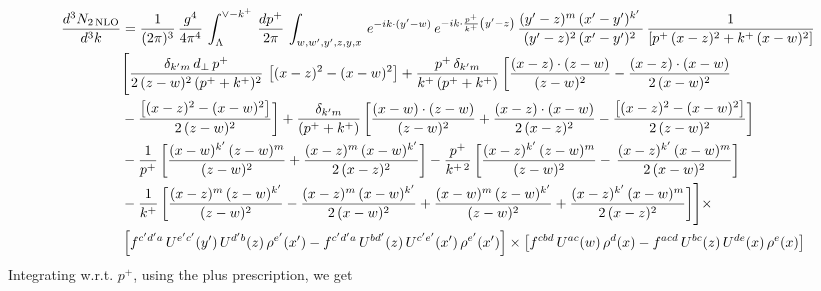 \documentclass[9pt]{article}
\numberwithin{equation}{section}
\begin{document}
\begin{align}
 \frac{d^{3}N_{2\,\rm NLO}}{d^{3}k} & =  \frac{1}{(2\pi)^{3}}\,\frac{g^{4}}{4\pi^{4}}\,\int_{\Lambda}^{\vee-k^{+}}\, \frac{dp^{+}}{2\pi}\,\int_{w,w',y',z,y,x}\, e^{-ik\cdot (y'-w)}\,e^{-ik\cdot \frac{p^{+}}{k^{+}}\left(y'-z\right)}\, \frac{(y'-z)^{m}\,(x'-y')^{k'}\,}{(y'-z)^{2}\,(x'-y')^{2}\,}\, \frac{1}{\left[p^{+}\,(x-z)^{2}+k^{+}\,(x-w)^{2}\right]}\notag \\ & \Bigg[\frac{\delta_{k'm}\,d_{\perp}\,p^{+}}{2\,(z-w)^{2}\,(p^{+}+k^{+})^{2}}\, \left[(x-z)^{2}-(x-w)^{2}\right]+\frac{p^{+}\,\delta_{k'm}}{k^{+}\,(p^{+}+k^{+})}\,\bigg[\frac{(x-z)\cdot (z-w)}{(z-w)^{2}} -\frac{(x-z)\cdot (x-w)}{2\,(x-w)^{2}}\notag \\ & -\frac{\left[(x-z)^{2}-(x-w)^{2}\right]}{2\,(z-w)^{2}}\bigg] +\frac{\delta_{k'm}}{(p^{+}+k^{+})}\,\bigg[\frac{(x-w)\cdot (z-w)}{(z-w)^{2}}+\frac{(x-z)\cdot (x-w)}{2\,(x-z)^{2}} -\frac{\left[(x-z)^{2}-(x-w)^{2}\right]}{2\,(z-w)^{2}}\bigg]\notag \\ & -\frac{1}{p^{+}}\,\bigg[\frac{(x-w)^{k'}\,(z-w)^{m}}{(z-w)^{2}}+\frac{(x-z)^{m}\,(x-w)^{k'}}{2\,(x-z)^{2}}\bigg]-\frac{p^{+}}{k^{+\,2}}\,\bigg[\frac{(x-z)^{k'}\,(z-w)^{m}}{(z-w)^{2}} -\,\frac{(x-z)^{k'}\,(x-w)^{m}}{2\,(x-w)^{2}}\bigg]\notag \\ & -\frac{1}{k^{+}}\,\bigg[\frac{(x-z)^{m}\,(z-w)^{k'}}{(z-w)^{2}}-\frac{(x-z)^{m}\,(x-w)^{k'}}{2\,(x-w)^{2}}+\frac{(x-w)^{m}\,(z-w)^{k'}}{(z-w)^{2}} +\frac{(x-z)^{k'}\,(x-w)^{m}}{2\,(x-z)^{2}}\bigg]\Bigg]\times\,\notag \\ & \left[f^{c'd'a}\,U^{e'c'}(y')\,U^{d'b}(z)\,\rho^{e'}(x')-f^{c'd'a}\, 
    U^{bd'}(z)\,U^{c'e'}(x')\,\rho^{e'}(x')\right]\times \left[f^{cbd}\,U^{ac}(w)\,\rho^{d}(x) -f^{acd}\,U^{bc}(z)\,U^{de}(x)\,\rho^{e}(x)\right]
\end{align}
Integrating w.r.t. $p^{+}$, using the plus prescription, we get
\end{document}
